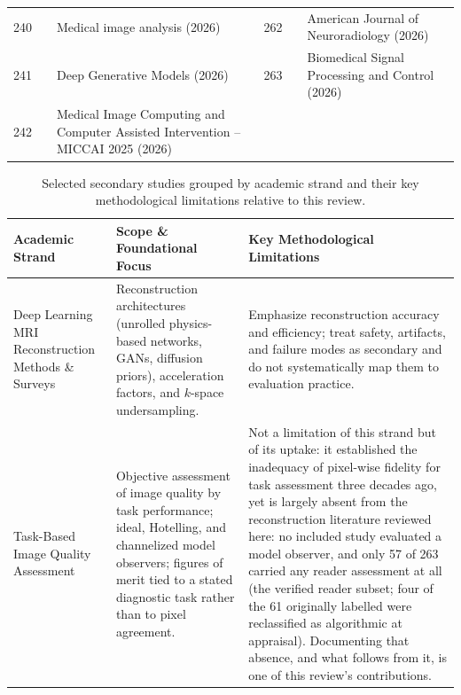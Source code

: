 \documentclass[11pt]{article}
\begin{document}
{\begin{longtable}{r l p{} r l p{}}
240 & \cite{zhang2026iterative} & Medical image analysis (2026) & 262 & \cite{verclytte2026deep} & American Journal of Neuroradiology (2026) \\
241 & \cite{wei2026latent} & Deep Generative Models (2026) & 263 & \cite{cao2026loddpm} & Biomedical Signal Processing and Control (2026) \\
242 & \cite{junhyeok2026lesionaware} & Medical Image Computing and Computer Assisted Intervention – MICCAI 2025 (2026) & & & \\
\end{longtable}}



\clearpage

\begin{table}[t]
\centering
\caption{Selected secondary studies grouped by academic strand and their key methodological limitations relative to this review.}
\label{tab:related}
\small
\setlength{\tabcolsep}{4pt}
\renewcommand{\arraystretch}{1.15}

\begin{tabular}{
    p{}
    p{}
    p{}
}
\hline
\textbf{Academic Strand} &
\textbf{Scope \& Foundational Focus} &
\textbf{Key Methodological Limitations} \\
\hline

Deep Learning MRI Reconstruction Methods \& Surveys \cite{liang2020deep,montalt2021machine,knoll2020fastmri,kazerouni2023diffusion,gngr2023adaptive,nimje2025insights,liu2026highly}
&
Reconstruction architectures (unrolled physics-based networks, GANs, diffusion priors), acceleration factors, and $k$-space undersampling.
&
Emphasize reconstruction accuracy and efficiency; treat safety, artifacts, and failure modes as secondary and do not systematically map them to evaluation practice.
\\
\hline

Task-Based Image Quality Assessment \cite{barrett1993model,barrett2004foundations,icru54}
&
Objective assessment of image quality by task performance; ideal, Hotelling, and channelized model observers; figures of merit tied to a stated diagnostic task rather than to pixel agreement.
&
Not a limitation of this strand but of its uptake: it established the inadequacy of pixel-wise fidelity for task assessment three decades ago, yet is largely absent from the reconstruction literature reviewed here: no included study evaluated a model observer, and only 57 of 263 carried any reader assessment at all (the verified reader subset; four of the 61 originally labelled were reclassified as algorithmic at appraisal). Documenting that absence, and what follows from it, is one of this review's contributions.
\\
\hline


\end{tabular}
\end{table}
\end{document}

